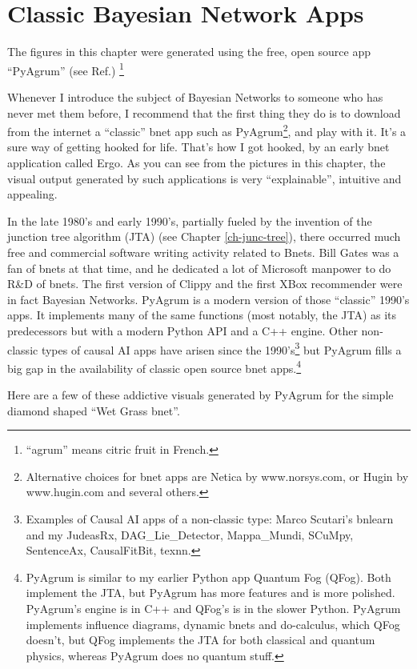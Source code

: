 \chapter{Classic Bayesian Network Apps}
\label{ch-bnet-apps}

The figures in this chapter were generated using
the free, open source app \enquote{PyAgrum} (see Ref.\cite{pyagrum})
\footnote{\enquote{agrum} means citric fruit in French. }


Whenever I introduce the subject of Bayesian Networks
to someone who has never met them before, I recommend that the first thing they do is to
download from the internet a \enquote{classic} bnet app  such as
PyAgrum\footnote{Alternative choices for bnet apps are Netica by www.norsys.com, or Hugin by www.hugin.com and several others.}, and play with it. It's a sure way of getting hooked
for life. That's how I got hooked, by an early bnet application called Ergo. As you can see from the pictures in this chapter,
the visual output generated by such applications is very \enquote{explainable},
 intuitive and appealing.

  
In the late 1980's and early 1990's, partially fueled by the invention of
the junction tree algorithm (JTA) (see Chapter \ref{ch-junc-tree}), there
occurred much free and commercial software writing activity related to Bnets. Bill Gates was a fan of bnets at that time, and he dedicated a lot of Microsoft manpower to do R\&D of bnets. The first version of Clippy and the first XBox recommender were in fact Bayesian Networks. PyAgrum is a modern version of those \enquote{classic} 1990's apps. It implements many of the same functions (most notably, the JTA) as its predecessors but with a modern Python API and a C++ engine. Other non-classic types of causal AI apps have arisen since the 1990's\footnote{Examples of Causal AI apps of a non-classic type:  Marco Scutari's bnlearn and my JudeasRx, DAG\_Lie\_Detector, Mappa\_Mundi, SCuMpy, SentenceAx, CausalFitBit, texnn.} but PyAgrum fills a big gap in the availability of classic open source bnet apps.\footnote{PyAgrum is similar to my earlier Python app Quantum Fog (QFog). Both implement the JTA, but PyAgrum  has more features and is more polished.
PyAgrum's engine is in C++ and QFog's is in the slower Python.  PyAgrum implements influence diagrams, dynamic bnets
and do-calculus, which QFog doesn't, but QFog implements the JTA for both classical and quantum physics, whereas PyAgrum does no quantum stuff.}

Here are a few of these addictive visuals generated by PyAgrum
for the simple diamond shaped  \enquote{Wet Grass bnet}.

